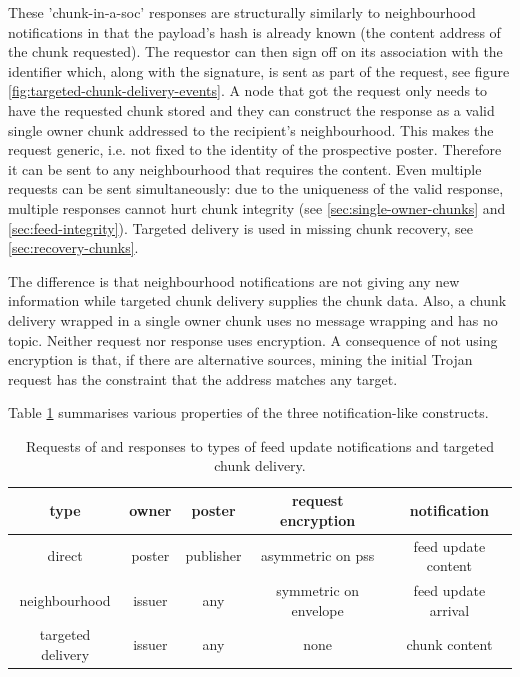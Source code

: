 These 'chunk-in-a-soc' responses are structurally similarly to neighbourhood notifications in that the payload's hash is already known (the content address of the chunk requested). The requestor can then sign off on its association with the identifier which, along with the signature, is sent as part of the request, see figure \ref{fig:targeted-chunk-delivery-events}. A node that got the request only needs to have the requested chunk stored and they can construct the response as a valid single owner chunk addressed to the recipient's neighbourhood.
This makes the request generic, i.e. not fixed to the identity of the prospective poster. Therefore it can be sent to any neighbourhood that requires the content. Even multiple requests can be sent simultaneously: due to the uniqueness of the valid response, multiple responses cannot hurt chunk integrity (see \ref{sec:single-owner-chunks} and \ref{sec:feed-integrity}). Targeted delivery is used in missing chunk recovery, see \ref{sec:recovery-chunks}.

The difference is that neighbourhood notifications are not giving any new information while targeted chunk delivery supplies the chunk data. Also, a chunk delivery wrapped in a single owner chunk uses no message wrapping and has no topic. Neither request nor response uses encryption.
A consequence of not using encryption is that, if there are alternative sources, mining the initial Trojan request has the constraint that the address matches any target. 

Table \ref{tab:notifications} summarises various properties of the three notification-like constructs.

\begin{table}[htpb]
    \centering
    \begin{tabular}{c|c|c|c|c|}
    type & owner & poster & request encryption & notification  \\\hline
         direct & poster & publisher & asymmetric on pss & feed update  content\\
         neighbourhood & issuer & any & symmetric on envelope & feed update arrival\\
         targeted delivery & issuer & any & none & chunk content\\
    \end{tabular}
    \caption[Feed update notifications]{Requests of and responses to types of feed update notifications and targeted chunk delivery.}
    \label{tab:notifications}
\end{table}

